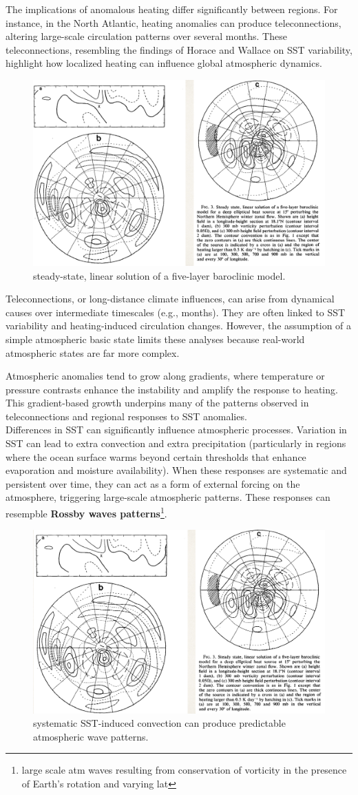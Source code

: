 The implications of anomalous heating differ significantly between regions. For instance, in the North Atlantic, heating anomalies can produce teleconnections, altering large-scale circulation patterns over several months. These teleconnections, resembling the findings of Horace and Wallace on SST variability, highlight how localized heating can influence global atmospheric dynamics.
\begin{figure}[htp!]
	\centering
	\includegraphics[width=0.4\linewidth]{uploads/Screenshot 2024-11-26 104358.png}
	\caption{steady-state, linear solution of a five-layer baroclinic model.}
	\label{fig:enter-label}
\end{figure}

Teleconnections, or long-distance climate influences, can arise from dynamical causes over intermediate timescales (e.g., months). They are often linked to SST variability and heating-induced circulation changes. However, the assumption of a simple atmospheric basic state limits these analyses because real-world atmospheric states are far more complex.

Atmospheric anomalies tend to grow along gradients, where temperature or pressure contrasts enhance the instability and amplify the response to heating. This gradient-based growth underpins many of the patterns observed in teleconnections and regional responses to SST anomalies.
\\
[0.2cm]

Differences in SST can significantly influence atmospheric processes. Variation in SST can lead to extra convection and extra precipitation (particularly in regions where the ocean surface warms beyond certain thresholds that enhance evaporation and moisture availability). When these responses are systematic and persistent over time, they can act as a form of external forcing on the atmosphere, triggering large-scale atmospheric patterns. These responses can resempble \textbf{Rossby waves patterns}\footnote{large scale atm waves resulting from conservation of vorticity in the presence of Earth's rotation and varying lat}.

\begin{figure}[htpb]
	\centering
	\includegraphics[width=0.5\linewidth]{uploads/imagewavesconn.png}
	\caption{systematic SST-induced convection can produce predictable atmospheric wave patterns.}
	\label{fig:enter-label}
\end{figure}
